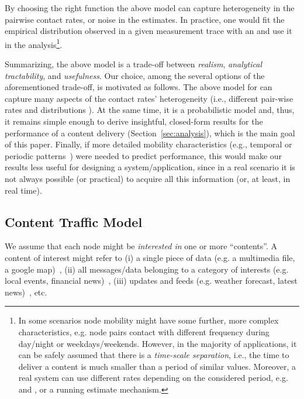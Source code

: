 \documentclass[journal]{IEEEtran}
\newcommand{\revisionRed}[1]{{#1}}\newcommand{\red}[1]{{#1}}
\begin{document}
By choosing the right function  the above model can capture heterogeneity in the pairwise contact rates, or noise in the estimates. In practice, one would fit the empirical distribution observed in a given measurement trace with an  and use it in the analysis\footnote{\red{In some scenarios node mobility might have some further, more complex characteristics, e.g. node pairs contact with different frequency  during day/night or weekdays/weekends. However, in the majority of applications, it can be safely assumed that there is a \textit{time-scale separation}, i.e., the time to deliver a content is much smaller than a period of similar  values. Moreover, a real system can use different rates depending on the considered period, e.g.  and , or a running estimate mechanism.}}.


\revisionRed{Summarizing, the above model is a trade-off between \textit{realism}, \textit{analytical tractability}, and \textit{usefulness}. Our choice, among the several options of the aforementioned trade-off, is motivated as follows. The above model for   can capture many aspects of the contact rates' heterogeneity (i.e., different pair-wise rates  and distributions ). At the same time, it is a probabilistic model and, thus, it remains simple enough to derive insightful, closed-form results for the performance of a content delivery (Section~\ref{sec:analysis}), which is the main goal of this paper. Finally, if more detailed mobility characteristics (e.g., temporal or periodic patterns~\cite{transient-contact-patterns}) were needed to predict performance, this would make our results less useful for designing a system/application, since in a real scenario it is not always possible (or practical) to acquire all this information (or, at least, in real time).}






\subsection{Content Traffic Model}\label{sec:content-traffic-model}

We assume that each node might be \textit{interested in} one or more ``contents''. A content of interest might refer to  (i) a single piece of data (e.g. a multimedia file, a google map)~\cite{offloading-wowmom11}, (ii) all messages/data belonging to a category of interests (e.g. local events, financial news)~\cite{Yoneki-publish-subscribe-dtn,Costa-publish-subscribe-dtn}, (iii) updates and feeds (e.g. weather forecast, latest news)~\cite{podcasting}, etc. 
\end{document}
